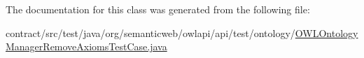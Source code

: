 The documentation for this class was generated from the following file\-:\begin{DoxyCompactItemize}
\item 
contract/src/test/java/org/semanticweb/owlapi/api/test/ontology/\hyperlink{_o_w_l_ontology_manager_remove_axioms_test_case_8java}{O\-W\-L\-Ontology\-Manager\-Remove\-Axioms\-Test\-Case.\-java}\end{DoxyCompactItemize}
